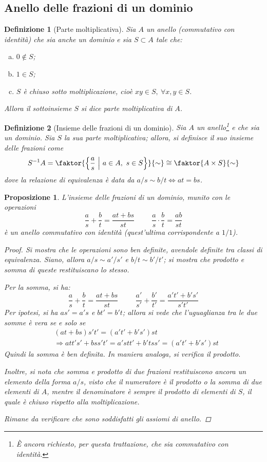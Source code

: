 \documentclass[12pt]{scrartcl}
\theoremstyle{style}
\newtheorem{definizione}{Definizione}[section]
\newtheorem{prop}{Proposizione}[section]
\numberwithin{equation}{subsection}
\begin{document}
\subsection{Anello delle frazioni di un dominio}
\begin{definizione}
	[Parte moltiplicativa]
	Sia $A$ un anello (commutativo con identit\`a) che sia anche un dominio e sia $S \subset A$ tale che:
	\begin{enumerate}[(a).]
		\item $0 \not \in S$;
		\item $1 \in S$;
		\item $S$ \`e chiuso sotto moltiplicazione, cio\`e $xy \in S, \ \forall x,y \in S$.
	\end{enumerate}
	Allora il sottoinsieme $S$ si dice \textit{parte moltiplicativa} di $A$.
\end{definizione}
\begin{definizione}
	[Insieme delle frazioni di un dominio]
	Sia $A$ un anello\footnote{\`E ancora richiesto, per questa trattazione, che sia commutativo con identit\`a.} e che sia un dominio.
	Sia $S$ la sua parte moltiplicativa; allora, si definisce il suo \textit{insieme delle frazioni} come
	\[
		S^{-1}A = \faktor{\left\{ \frac{a}{s}\ \Big\lvert \  a \in A ,\ s \in S \right\}}{\sim} \cong \faktor{A\times S}{\sim}
	\] 
	dove la relazione di equivalenza \`e data da $a / s \sim b / t \iff at = bs$.
\end{definizione}
\begin{prop}
	L'insieme delle frazioni di un dominio, munito con le operazioni
	\[
	\frac{a}{s}+\frac{b}{t}=\frac{at + bs}{st} \hspace{1cm} \frac{a}{s}\cdot \frac{b}{t} = \frac{ab}{st}
	\] 
	\`e un anello commutativo con identit\`a (quest'ultima corrispondente a $1 / 1$).
	\begin{proof}
		Si mostra che le operazioni sono ben definite, avendole definite tra classi di equivalenza. 
		Siano, allora $a / s \sim a' / s' $ e $ b/t \sim b' / t'$; si mostra che prodotto e somma di queste restituiscano lo stesso.

		Per la somma, si ha:
		\[
		\frac{a}{s}+\frac{b}{t}=\frac{at + bs}{st}\hspace{1cm}\frac{a'}{s'}+\frac{b'}{t'}=\frac{a't' + b's'}{s't'}
		\] 
		Per ipotesi, si ha $as' = a' s $ e $bt' = b' t$; allora si vede che l'uguaglianza tra le due somme \`e vera se e solo se 
		\[
			\begin{split}
				&(at + bs ) s ' t' = (a't'+b's') st\\
				&\Rightarrow att's' + bs s't' = a'st t ' + b't s s' = (a't'+b's') st
			\end{split}
		\] 
		Quindi la somma \`e ben definita.
		In maniera analoga, si verifica il prodotto.

		Inoltre, si nota che somma e prodotto di due frazioni restituiscono ancora un elemento della forma $a / s$, visto che il numeratore \`e il prodotto o la somma di due elementi di $A$, mentre il denominatore \`e sempre il prodotto di elementi di $S$, il quale \`e chiuso rispetto alla moltiplicazione.
		
		Rimane da verificare che sono soddisfatti gli assiomi di anello.
	\end{proof}
\end{prop}
\end{document}
